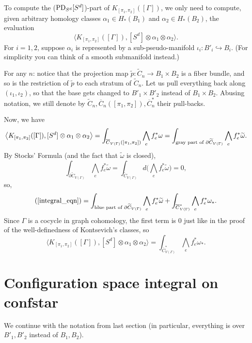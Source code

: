 \documentclass[11pt]{article}
\theoremstyle{definition}
\theoremstyle{remark}
\def\wt#1{\widetilde{#1}}
\def\ov#1{\overline{#1}}
\def\tn#1{\textnormal{#1}}
\begin{document}
To compute the ($\tn{PD}_{S^d}[S^d]$)-part of $K_{[\pi_1,\pi_2]}([\Gamma])$, we only need to compute, given arbitrary homology classes $\alpha_1\in H_*(B_1)$ and $\alpha_2\in H_*(B_2)$, the evaluation
$$\big\langle K_{[\pi_1,\pi_2]}([\Gamma]), [S^d]\otimes\alpha_1\otimes\alpha_2 \big\rangle.$$
For $i=1,2$, suppose $\alpha_i$ is represented by a sub-pseudo-manifold $\iota_i:B'_i\hookrightarrow B_i$. (For simplicity you can think of a smooth submanifold instead.)

For any $n$: notice that the projection map 
$\wt{p}:\wt{C}_n\to B_1\times B_2$
is a fiber bundle, and so is the restriction of $\wt{p}$ to each stratum of $\wt{C}_n$.
Let us pull everything back along $(\iota_1,\iota_2)$, so that the base gets changed to $B'_1\times B'_2$ instead of $B_1\times B_2$. 
Abusing notation, we still denote by
$\wt{C}_n,\ov{C}_n([\pi_1,\pi_2]),\ov{C}^*_n$
their pull-backs. 

Now, we have 
\begin{equation}
\label{integral_eqn}
\big\langle K_{[\pi_1,\pi_2]}([\Gamma]), [S^d]\otimes\alpha_1\otimes\alpha_2 \big\rangle=
\int_{\ov{C}_{V(\Gamma)}([\pi_1,\pi_2])}\bigwedge_{e}f_e^*{\omega}=
\int_{\tn{gray part of }\partial\wt{C}_{V(\Gamma)}}\bigwedge_{e}f_e^*\wt{\omega}.
\end{equation}
By Stocks' Formula (and the fact that $\wt\omega$ is closed), 
$$\int_{\partial\wt{C}_{V(\Gamma)}}\bigwedge_{e}f_e^*\wt{\omega}=\int_{\wt{C}_{V(\Gamma)}}d\Big(\bigwedge_{e}f_e^*\wt{\omega}\Big)=0,$$
so, 
$$(\ref{integral_eqn})=\int_{\tn{blue part of }\partial\wt{C}_{V(\Gamma)}}\bigwedge_{e}f_e^*\wt{\omega}+\int_{\ov{C}^*_{V(\Gamma)}}\bigwedge_{e}f_e^*{\omega_*}.$$
Since $\Gamma$ is a cocycle in graph cohomology, the first term is 0 just like in the proof of the well-definedness of Kontsevich's classes, so
$$\big\langle K_{[\pi_1,\pi_2]}([\Gamma]), [S^d]\otimes\alpha_1\otimes\alpha_2 \big\rangle=
\int_{\ov{C}^*_{V(\Gamma)}}\bigwedge_{e}f_e^*{\omega_*}.$$

\section{Configuration space integral on confstar}

We continue with the notation from last section (in particular, everything is over $B'_1, B'_2$ instead of $B_1, B_2$). 
\end{document}
